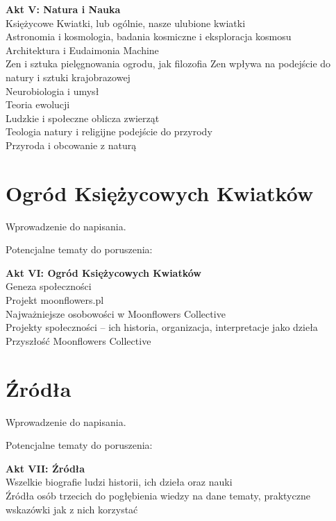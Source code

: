 \documentclass[]{coda-art}
\begin{document}
\textbf{Akt V: Natura i Nauka} \\
Księżycowe Kwiatki, lub ogólnie, nasze ulubione kwiatki \\
Astronomia i kosmologia, badania kosmiczne i eksploracja kosmosu \\
Architektura i Eudaimonia Machine \\
Zen i sztuka pielęgnowania ogrodu, jak filozofia Zen wpływa na podejście do natury i sztuki krajobrazowej \\
Neurobiologia i umysł \\
Teoria ewolucji \\
Ludzkie i społeczne oblicza zwierząt \\
Teologia natury i religijne podejście do przyrody \\
Przyroda i obcowanie z naturą



\clearpage\part{Ogród Księżycowych Kwiatków}
\label{akt:ogrod}

Wprowadzenie do napisania.

\vin Potencjalne tematy do poruszenia: 

\textbf{Akt VI: Ogród Księżycowych Kwiatków} \\
Geneza społeczności \\
Projekt moonflowers.pl \\
Najważniejsze osobowości w Moonflowers Collective \\
Projekty społeczności -- ich historia, organizacja, interpretacje jako dzieła \\
Przyszłość Moonflowers Collective



\clearpage\part{Źródła}
\label{akt:zrodla}

Wprowadzenie do napisania.

\vin Potencjalne tematy do poruszenia: 

\textbf{Akt VII: Źródła} \\
Wszelkie biografie ludzi historii, ich dzieła oraz nauki \\
Źródła osób trzecich do pogłębienia wiedzy na dane tematy, praktyczne wskazówki jak z nich korzystać
\end{document}
